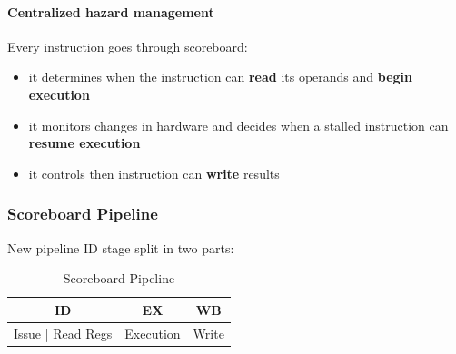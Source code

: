 \paragraph{Centralized hazard management} Every instruction goes through scoreboard:
\begin{itemize}
    \item it determines when the instruction can \textbf{read} its operands and \textbf{begin execution}
    \item it monitors changes in hardware and decides when a stalled instruction can \textbf{resume execution}
    \item it controls then instruction can \textbf{write} results
\end{itemize}

\subsubsection{Scoreboard Pipeline}\label{subsubsec:scoreboard-pipeline}
New pipeline ID stage split in two parts:

\begin{table}[h]
    \centering
    \begin{tabular}{|c|c|c|}
        \toprule
        \textbf{ID} & \textbf{EX} & \textbf{WB} \\
        \midrule
        Issue | Read Regs & Execution & Write \\
        \bottomrule
    \end{tabular}
    \caption{Scoreboard Pipeline}
    \label{tab:scoreboard-pipeline}
\end{table}

